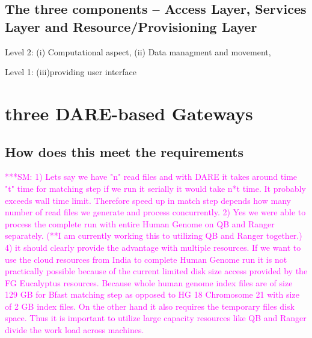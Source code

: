 \documentclass[12pt]{article}
\newcommand{\smnote}[1]{  {\textcolor{magenta} {***SM: #1}}}
\newcommand{\smnote}[1]{}
\begin{document}
\subsection{The three components -- Access Layer, Services Layer and
  Resource/Provisioning Layer} 

Level 2: (i) Computational aspect, (ii) Data managment and movement, 

Level 1: (iii)providing user interface

\section{three DARE-based Gateways}

\subsection{How does this meet the requirements}
\smnote{ 1) Lets say we have "n" read files and with DARE it takes around time "t" time for matching step if we run it serially it would take n*t time. It probably exceeds wall time limit. Therefore speed up in match step depends how many number of read files we generate and process concurrently.
2) Yes we were able to process the complete run with entire Human Genome on QB and Ranger separately. (**I am currently working this to utilizing QB and Ranger together.) 
4) it should clearly provide the advantage with multiple resources. If we want to use the cloud resources from India to complete Human Genome run it is not practically possible because of the current limited disk size access provided by the FG Eucalyptus resources. Because whole human genome index files are of size 129 GB for Bfast matching step as opposed to HG 18 Chromosome 21 with size of  2 GB index files. On the other hand it also requires the temporary files disk space.  Thus it is important to utilize large capacity resources like QB and Ranger divide the work load across machines.}




\end{document}
